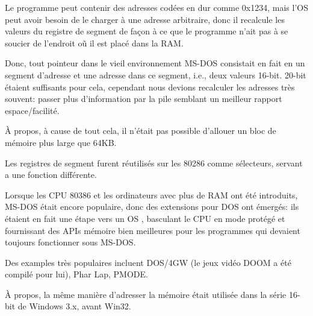 Le programme peut contenir des adresses codées en dur comme 0x1234, mais l'\ac{OS}
peut avoir besoin de le charger à une adresse arbitraire, donc il recalcule les valeurs
du registre de segment de façon à ce que le programme n'ait pas à se soucier de
l'endroit oũ il est placé dans la RAM.

Donc, tout pointeur dans le vieil environnement MS-DOS consistait en fait en un segment
d'adresse et une adresse dans ce segment, i.e., deux valeurs 16-bit. 20-bit étaient
suffisants pour cela, cependant nous devions recalculer les adresses très souvent:
passer plus d'information par la pile semblant un meilleur rapport espace/facilité.

À propos, à cause de tout cela, il n'était pas possible d'allouer un bloc de mémoire
plus large que 64KB.


Les registres de segment furent réutilisés sur les 80286 comme sélecteurs, servant
a une fonction différente.


Lorsque les CPU 80386 et les ordinateurs avec plus de \ac{RAM} ont été introduits,
MS-DOS était encore populaire, donc des extensions pour DOS ont émergés: ils étaient
en fait une étape vers un \ac{OS} , basculant le CPU en mode protégé et
fournissant des \ac{API}s mémoire bien meilleures pour les programmes qui devaient
toujours fonctionner sous MS-DOS.

Des examples très populaires incluent DOS/4GW (le jeux vidéo DOOM a été compilé pour
lui), Phar Lap, PMODE.
\par
{}

À propos, la même manière d'adresser la mémoire était utilisée dans la série 16-bit
de Windows 3.x, avant Win32.

